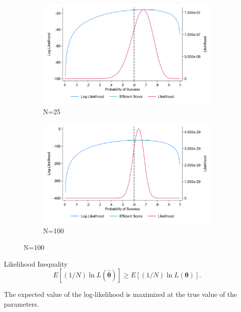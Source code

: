 \documentclass[a4paper,12pt]{article}
\begin{document}
\begin{figure}[H]
        \begin{subfigure}[c]{0.49\textwidth}
            \centering
            \includegraphics[width=1\textwidth]{figures/ll_25}
            \caption{N=25}
            \label{fig:distribution beta1 N25}								
        \end{subfigure}
        \begin{subfigure}[c]{0.49\textwidth}
            \centering
            \includegraphics[width=1\textwidth]{figures/ll_100}
            \caption{N=100}
            \label{fig:distribution beta1 N100}								
        \end{subfigure}
    \end{figure}




Likelihood Inequality
$$E[(1/N)\ln L(\hat{\boldsymbol{\theta}})]\geq E[(1/N)\ln L(\boldsymbol{\theta})].$$

\noindent The expected value of the log-likelihood is maximized at the true value of the parameters.
\end{document}
